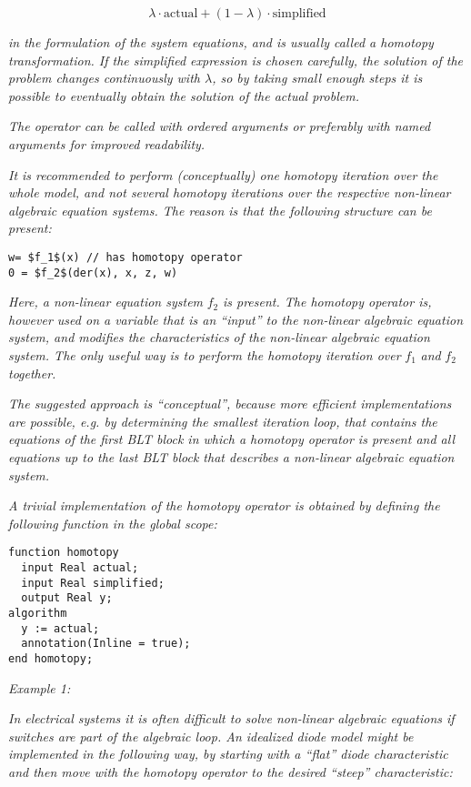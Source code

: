 $$\lambda\cdot\text{actual} + (1-\lambda)\cdot\text{simplified}$$

\emph{in the formulation of the system equations, and is usually called
a homotopy transformation. If the simplified expression is chosen
carefully, the solution of the problem changes continuously with $\lambda$,
so by taking small enough steps it is possible to eventually obtain the
solution of the actual problem.}

\emph{The operator can be called with ordered arguments or preferably
with named arguments for improved readability.}

\emph{It is recommended to perform (conceptually) one homotopy iteration
over the whole model, and not several homotopy iterations over the
respective non-linear algebraic equation systems. The reason is that the
following structure can be present:}

\begin{lstlisting}[language=modelica, mathescape=true]
w= $f_1$(x) // has homotopy operator
0 = $f_2$(der(x), x, z, w)
\end{lstlisting}

\emph{Here, a non-linear equation system} $f_2$
\emph{is present. The homotopy operator is, however used on a variable
that is an ``input'' to the non-linear algebraic equation system, and
modifies the characteristics of the non-linear algebraic equation
system. The only useful way is to perform the homotopy iteration over}
$f_1$ \emph{and} $f_2$
\emph{together.}

\emph{The suggested approach is ``conceptual'', because more efficient
implementations are possible, e.g. by determining the smallest iteration
loop, that contains the equations of the first BLT block in which a
homotopy operator is present and all equations up to the last BLT block
that describes a non-linear algebraic equation system.}

\emph{A trivial implementation of the homotopy operator is obtained by
defining the following function in the global scope:}

\begin{lstlisting}[language=modelica]
function homotopy
  input Real actual;
  input Real simplified;
  output Real y;
algorithm
  y := actual;
  annotation(Inline = true);
end homotopy;
\end{lstlisting}

\emph{Example 1:}

\emph{In electrical systems it is often difficult to solve non-linear
algebraic equations if switches are part of the algebraic loop. An
idealized diode model might be implemented in the following way, by
starting with a ``flat'' diode characteristic and then move with the
homotopy operator to the desired ``steep'' characteristic:}

